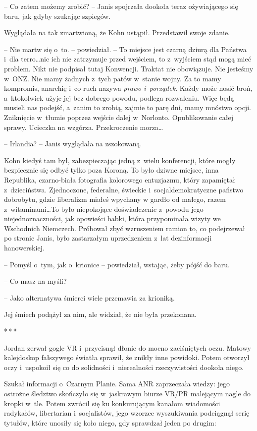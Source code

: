 \documentclass[oneside,polish,11pt,sfheadings]{mwbk}
\newcommand{\threeast}{\bigskip\par\centerline{*\,*\,*}\medskip\par}%
\begin{document}
-- Co zatem możemy zrobić? -- Janis spojrzała dookoła teraz ożywiającego
się baru, jak gdyby szukając szpiegów.

Wyglądała na tak zmartwioną, że Kohn ustąpił. Przedstawił swoje zdanie.

-- Nie martw się o~to. -- powiedział. -- To miejsce jest czarną dziurą dla
Państwa i~dla terro\ldots nic ich nie zatrzymuje przed wejściem, to z~wyjściem stąd mogą mieć problem. Nikt nie podpisał tutaj Konwencji.
Traktat nie obowiązuje. Nie jesteśmy w~ONZ. Nie mamy żadnych z~tych
patów w~stanie wojny. Za to mamy kompromis, anarchię i~co ruch nazywa
\emph{prawo i~porządek}. Każdy może nosić broń, a~ktokolwiek użyje jej
bez dobrego powodu, podlega rozwaleniu. Więc będą musieli nas podejść, a~zanim to zrobią, zajmie to parę dni, mamy mnóstwo opcji. Zniknięcie w~tłumie poprzez wejście dalej w~Norlonto. Opublikowanie całej sprawy.
Ucieczka na wzgórza. Przekroczenie morza\ldots

-- Irlandia? -- Janis wyglądała na zszokowaną.

Kohn kiedyś tam był, zabezpieczając jedną z~wielu konferencji, które
mogły bezpiecznie się odbyć tylko poza Koroną. To było dziwne miejsce,
inna Republika, czarno-biała fotografia kolorowego entuzjazmu, który
zapamiętał z~dzieciństwa. Zjednoczone, federalne, świeckie i~socjaldemokratyczne państwo dobrobytu, gdzie liberalizm miałeś wpychany
w gardło od małego, razem z~witaminami\ldots To było niepokojące
doświadczenie z~powodu jego niejednoznaczności, jak opowieści babki,
która przypominała wizyty we Wschodnich Niemczech. Próbował zbyć
wzruszeniem ramion to, co podejrzewał po stronie Janis, było zastarzałym
uprzedzeniem z~lat dezinformacji hanowerskiej.

-- Pomyśl o~tym, jak o~krionice -- powiedział, wstając, żeby pójść do
baru.

-- Co masz na myśli?

-- Jako alternatywa śmierci wiele przemawia za krioniką.

Jej śmiech podążył za nim, ale widział, że nie była przekonana.
  \threeast 

Jordan zerwał gogle VR i~przycisnął dłonie do mocno zaciśniętych oczu.
Matowy kalejdoskop fałszywego światła sprawił, że znikły inne powidoki.
Potem otworzył oczy i~uspokoił się co do solidności i~nierealności
rzeczywistości dookoła niego.

Szukał informacji o~Czarnym Planie. Sama ANR zaprzeczała wiedzy: jego
ostrożne śledztwo skończyło się w~jaskrawym biurze VR/PR malejącym nagle
do kropki w~tle. Potem zwrócił się ku konkurującym kanałom wiadomości
radykałów, libertarian i~socjalistów, jego wzorzec wyszukiwania
podciągnął serię tytułów, które unosiły się koło niego, gdy sprawdzał
jeden po drugim:
\end{document}
